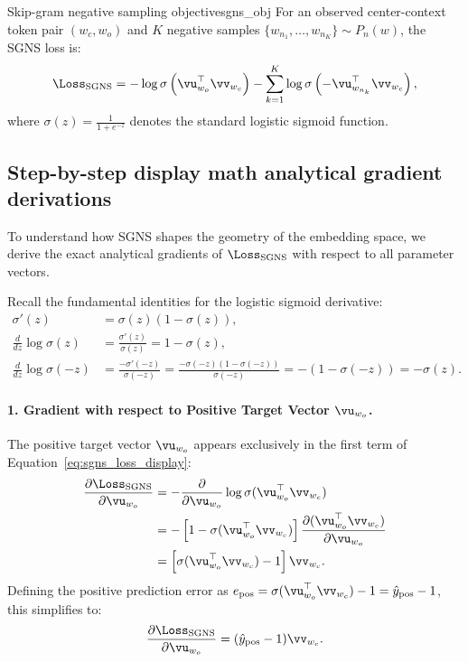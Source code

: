 \documentclass[../../main.tex]{subfiles}
\begin{document}
\begin{definition}{Skip-gram negative sampling objective}{sgns_obj}
For an observed center-context token pair $(w_c, w_o)$ and $K$ negative samples $\{w_{n_1}, \dots, w_{n_K}\} \sim P_n(w)$, the SGNS loss is:
\begin{equation}
\label{eq:sgns_loss_display}
\Loss_{\text{SGNS}} = -\log \sigma\left( \vu_{w_o}^\top \vv_{w_c} \right) - \sum_{k=1}^K \log \sigma\left( -\vu_{w_{n_k}}^\top \vv_{w_c} \right),
\end{equation}
where $\sigma(z) = \frac{1}{1 + e^{-z}}$ denotes the standard logistic sigmoid function.
\end{definition}

\subsection{Step-by-step display math analytical gradient derivations}
\label{subsec:sgns_gradients}

To understand how SGNS shapes the geometry of the embedding space, we derive the exact analytical gradients of $\Loss_{\text{SGNS}}$ with respect to all parameter vectors.

Recall the fundamental identities for the logistic sigmoid derivative:
\begin{align}
\label{eq:sigmoid_deriv_identity}
\sigma'(z) &= \sigma(z)(1 - \sigma(z)), \\
\label{eq:log_sigmoid_pos}
\frac{d}{dz} \log \sigma(z) &= \frac{\sigma'(z)}{\sigma(z)} = 1 - \sigma(z), \\
\label{eq:log_sigmoid_neg}
\frac{d}{dz} \log \sigma(-z) &= \frac{-\sigma'(-z)}{\sigma(-z)} = \frac{-\sigma(-z)(1 - \sigma(-z))}{\sigma(-z)} = -(1 - \sigma(-z)) = -\sigma(z).
\end{align}

\paragraph{1. Gradient with respect to Positive Target Vector $\vu_{w_o}$.}
The positive target vector $\vu_{w_o}$ appears exclusively in the first term of Equation~\eqref{eq:sgns_loss_display}:
\begin{align}
\frac{\partial \Loss_{\text{SGNS}}}{\partial \vu_{w_o}} &= -\frac{\partial}{\partial \vu_{w_o}} \log \sigma(\vu_{w_o}^\top \vv_{w_c}) \notag \\
&= -\left[ 1 - \sigma(\vu_{w_o}^\top \vv_{w_c}) \right] \frac{\partial (\vu_{w_o}^\top \vv_{w_c})}{\partial \vu_{w_o}} \notag \\
\label{eq:grad_u_pos}
&= \left[ \sigma(\vu_{w_o}^\top \vv_{w_c}) - 1 \right] \vv_{w_c}.
\end{align}
Defining the positive prediction error as $e_{\text{pos}} = \sigma(\vu_{w_o}^\top \vv_{w_c}) - 1 = \hat{y}_{\text{pos}} - 1$, this simplifies to:
\begin{equation}
\label{eq:grad_u_pos_clean}
\frac{\partial \Loss_{\text{SGNS}}}{\partial \vu_{w_o}} = (\hat{y}_{\text{pos}} - 1) \vv_{w_c}.
\end{equation}
\end{document}
